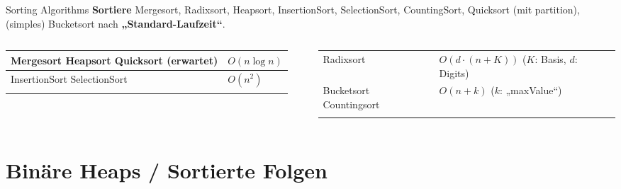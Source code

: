 \begin{frame}{Sorting Algorithms}
	\textbf{Sortiere} Mergesort, Radixsort, Heapsort, InsertionSort, SelectionSort, CountingSort, Quicksort {\small (mit partition)}, (simples) Bucketsort nach \textbf{„Standard-Laufzeit“}. \\ \pause
	\forcenewline
	\begin{columns}
		\hspace{.2\baselineskip}
		\begin{tabular}{m{.487\linewidth} | m{.3\linewidth} }
			\hhline{=|=}
			Mergesort \newline
			Heapsort \newline 
			Quicksort (erwartet) & $O(n \log n)$ \\
			\hline 
			InsertionSort \newline 
			SelectionSort & $O(n^2)$ \\
			\hhline{=|=}
		\end{tabular}
		\hspace{-1\baselineskip}
		\begin{tabular}{m{.37\linewidth} | m{.47\linewidth} }
			\hhline{=|=}
			Radixsort & $O(d \cdot (n + K))$ \newline ($K$: Basis, \newline $d$: Digits)\\
			\hhline{=|=}
			Bucketsort \newline
			Countingsort & $O(n+k)$ \newline ($k$: „maxValue“) \\
			\hhline{=|=}
		\end{tabular}
	\end{columns}
\end{frame}




\section{Binäre Heaps / Sortierte Folgen}

